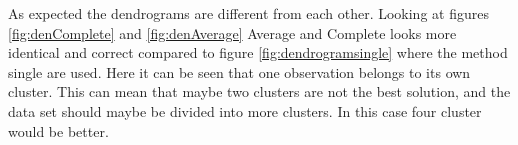 


As expected the dendrograms are different from each other.
Looking at figures \ref{fig:denComplete} and \ref{fig:denAverage} Average and Complete looks more identical and correct compared to figure \ref{fig:dendrogramsingle} where the method single are used. Here it can be seen that one observation belongs to its own cluster. This can mean that maybe two clusters are not the best solution, and the data set should maybe be divided into more clusters. In this case four cluster would be better.